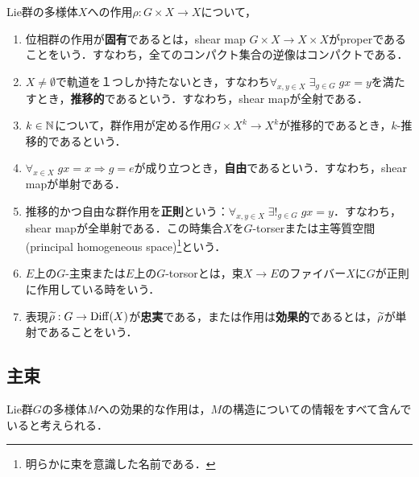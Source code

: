 \documentclass[uplatex,dvipdfmx]{jsreport}
\begin{document}
\begin{definition}
    Lie群の多様体$X$への作用$\rho:G\times X\to X$について，
    \begin{enumerate}
        \item 位相群の作用が\textbf{固有}であるとは，shear map $G\times X\to X\times X$がproperであることをいう．すなわち，全てのコンパクト集合の逆像はコンパクトである．
        \item $X\ne\emptyset$で軌道を１つしか持たないとき，すなわち$\forall_{x,y\in X}\;\exists_{g\in G}\;gx=y$を満たすとき，\textbf{推移的}であるという．すなわち，shear mapが全射である．
        \item $k\in\mathbb{N}$について，群作用が定める作用$G\times X^k\to X^k$が推移的であるとき，$k$-推移的であるという．
        \item $\forall_{x\in X}\;gx=x\Rightarrow g=e$が成り立つとき，\textbf{自由}であるという．すなわち，shear mapが単射である．
        \item 推移的かつ自由な群作用を\textbf{正則}という：$\forall_{x,y\in X}\;\exists!_{g\in G}\;gx=y$．すなわち，shear mapが全単射である．この時集合$X$を$G$-torserまたは主等質空間(principal homogeneous space)\footnote{明らかに束を意識した名前である．}という．
        \item $E$上の$G$-主束または$E$上の$G$-torsorとは，束$X\to E$のファイバー$X$に$G$が正則に作用している時をいう．
        \item 表現$\widetilde{\rho}:G\to\mathrm{Diff}(X)$が\textbf{忠実}である，または作用は\textbf{効果的}であるとは，$\widetilde{\rho}$が単射であることをいう．
    \end{enumerate}
\end{definition}

\subsection{主束}

\begin{tcolorbox}[colframe=ForestGreen, colback=ForestGreen!10!white,breakable,colbacktitle=ForestGreen!40!white,coltitle=black,fonttitle=\bfseries\sffamily,
title=]
    Lie群$G$の多様体$M$への効果的な作用は，$M$の構造についての情報をすべて含んでいると考えられる．
\end{tcolorbox}
\end{document}
